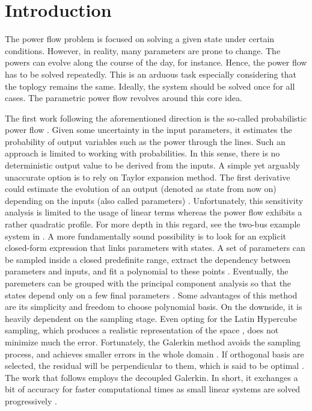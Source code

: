 \section{Introduction}
The power flow problem is focused on solving a given state under certain conditions. However, in reality, many parameters are prone to change. The powers can evolve along the course of the day, for instance. Hence, the power flow has to be solved repeatedly. This is an arduous task especially considering that the toplogy remains the same. Ideally, the system should be solved once for all cases. The parametric power flow revolves around this core idea.

The first work following the aforementioned direction is the so-called probabilistic power flow \cite{allan1974probabilistic}. Given some uncertainty in the input parameters, it estimates the probability of output variables such as the power through the lines. Such an approach is limited to working with probabilities. In this sense, there is no deterministic output value to be derived from the inputs. A simple yet arguably unaccurate option is to rely on Taylor expansion method. The first derivative could estimate the evolution of an output (denoted as state from now on) depending on the inputs (also called parameters) \cite{choi2016propagating}. Unfortunately, this sensitivity analysis is limited to the usage of linear terms whereas the power flow exhibits a rather quadratic profile. For more depth in this regard, see the two-bus example system in \cite{trias2018helm}. A more fundamentally sound possibility is to look for an explicit closed-form expression that links parameters with states. A set of parameters can be sampled inside a closed predefinite range, extract the dependency between parameters and inputs, and fit a polynomial to these points \cite{shen2020principal}. Eventually, the paremeters can be grouped with the principal component analysis so that the states depend only on a few final parameters \cite{constantine2014active}. Some advantages of this method are its simplicity and freedom to choose polynomial basis. On the downside, it is heavily dependent on the sampling stage. Even opting for the Latin Hypercube sampling, which produces a realistic representation of the space \cite{mckay2000comparison}, does not minimize much the error. Fortunately, the Galerkin method avoids the sampling process, and achieves smaller errors in the whole domain \cite{zhou2019global}. If orthogonal basis are selected, the residual will be perpendicular to them, which is said to be optimal \cite{wu2020parametric}. The work that follows employs the decoupled Galerkin. In short, it exchanges a bit of accuracy for faster computational times as small linear systems are solved progressively \cite{zhou2016novel}.

